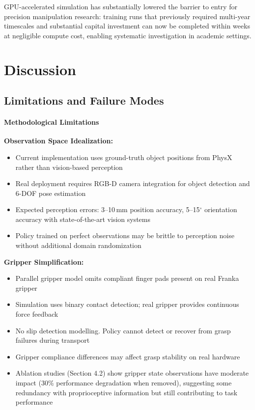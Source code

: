 \documentclass[12pt,a4paper,oneside]{report}
\begin{document}
GPU-accelerated simulation has substantially lowered the barrier to entry for precision manipulation research: training runs that previously required multi-year timescales and substantial capital investment can now be completed within weeks at negligible compute cost, enabling systematic investigation in academic settings.

\chapter{Discussion}

\section{Limitations and Failure Modes}

\subsubsection{Methodological Limitations}

\textbf{Observation Space Idealization:}
\begin{itemize}
    \item Current implementation uses ground-truth object positions from PhysX rather than vision-based perception
    \item Real deployment requires RGB-D camera integration for object detection and 6-DOF pose estimation
    \item Expected perception errors: 3--10\,mm position accuracy, 5--15$^\circ$ orientation accuracy with state-of-the-art vision systems
    \item Policy trained on perfect observations may be brittle to perception noise without additional domain randomization
\end{itemize}

\textbf{Gripper Simplification:}
\begin{itemize}
    \item Parallel gripper model omits compliant finger pads present on real Franka gripper
    \item Simulation uses binary contact detection; real gripper provides continuous force feedback
    \item No slip detection modelling. Policy cannot detect or recover from grasp failures during transport
    \item Gripper compliance differences may affect grasp stability on real hardware
    \item Ablation studies (Section 4.2) show gripper state observations have moderate impact (30\% performance degradation when removed), suggesting some redundancy with proprioceptive information but still contributing to task performance
\end{itemize}
\end{document}
